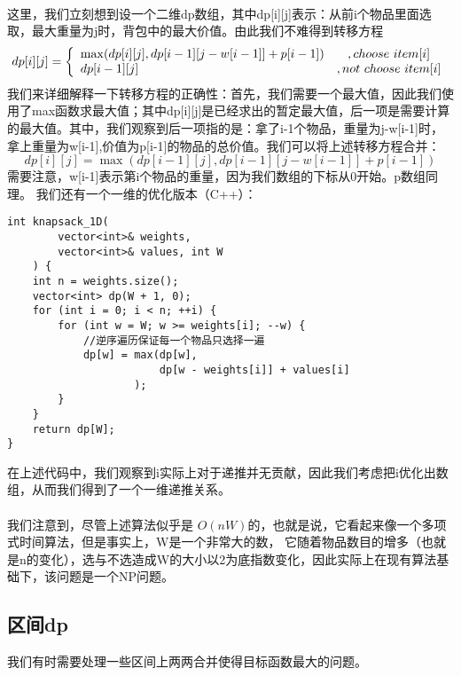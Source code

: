 \documentclass[12pt,a4paper,UTF16]{ctexbook}
\theoremstyle{plain}
\begin{document}
\paragraph{}这里，我们立刻想到设一个二维dp数组，其中dp[i][j]表示：从前i个物品里面选取，最大重量为j时，背包中的最大价值。由此我们不难得到转移方程
\begin{equation}
    dp[i][j]=\left\{\begin{array}{lc} \mathrm{max}(dp[i][j],dp[i-1][j-w[i-1]]+p[i-1])&,choose $\space$ item[i]\\dp[i-1][j]&,not $\space$ choose $\space$ item[i]\end{array}\right.
\end{equation}
我们来详细解释一下转移方程的正确性：首先，我们需要一个最大值，因此我们使用了max函数求最大值；其中dp[i][j]是已经求出的暂定最大值，后一项是需要计算的最大值。其中，我们观察到后一项指的是：拿了i-1个物品，重量为j-w[i-1]时，拿上重量为w[i-1],价值为p[i-1]的物品的总价值。我们可以将上述转移方程合并：
\begin{equation}
    dp[i][j]=\max (dp[i-1][j],dp[i-1][j-w[i-1]]+p[i-1])
\end{equation}
需要注意，w[i-1]表示第i个物品的重量，因为我们数组的下标从0开始。p数组同理。
我们还有一个一维的优化版本（C++）：
\begin{lstlisting}[basicstyle=\ttfamily]
  int knapsack_1D(
        vector<int>& weights,
        vector<int>& values, int W
    ) {
    int n = weights.size();
    vector<int> dp(W + 1, 0);
    for (int i = 0; i < n; ++i) {
        for (int w = W; w >= weights[i]; --w) {
            //逆序遍历保证每一个物品只选择一遍
            dp[w] = max(dp[w],
                        dp[w - weights[i]] + values[i]
                    );
        }
    }
    return dp[W];
}
\end{lstlisting}
在上述代码中，我们观察到i实际上对于递推并无贡献，因此我们考虑把i优化出数组，从而我们得到了一个一维递推关系。
\paragraph{}我们注意到，尽管上述算法似乎是 $O(nW)$的，也就是说，它看起来像一个多项式时间算法，但是事实上，W是一个非常大的数，
它随着物品数目的增多（也就是n的变化），选与不选造成W的大小以2为底指数变化，因此实际上在现有算法基础下，该问题是一个NP问题。

\subsection{区间dp}
我们有时需要处理一些区间上两两合并使得目标函数最大的问题。
\end{document}
